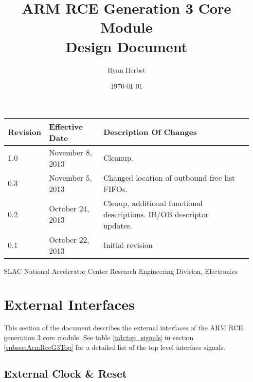 \documentclass[11pt]{article}
\begin{document}
\thispagestyle{empty}

\title{ARM RCE Generation 3 Core Module \\ Design Document}
\author{Ryan Herbst}
\date{\today}

\maketitle
\begin{table}[H]
\centering
   \begin{tabular}{| l | l | l | l | } 
      \hline \textbf{Revision} & \textbf{Effective Date} & \textbf{Description Of Changes} \\
      \hline 1.0               & November 8, 2013        & Cleanup.  \\
      \hline 0.3               & November 5, 2013        & Changed location of outbound free list FIFOs.  \\
      \hline 0.2               & October 24, 2013        & Cleaup, additional functional descriptions. IB/OB descriptor updates. \\
      \hline 0.1               & October 22, 2013        & Initial revision                \\
      \hline
   \end{tabular}
\end{table}

\vfill
\begin{center}
SLAC National Accelerator Center
Research Engineering Division, Electronics
\end{center}
\newpage
\tableofcontents

\newpage
\listoftables

\newpage
\listoffigures

\newpage
\section{External Interfaces}
\label{sec:external_interfaces}

This section of the document describes the external interfaces of the ARM RCE generation 3 core module. See
table \ref{tab:top_signals} in section \ref{subsec:ArmRceG3Top} for a detailed list of the top level interface signals.

\subsection{External Clock \& Reset}
\label{subsec:external_clock_reset}
\end{document}
